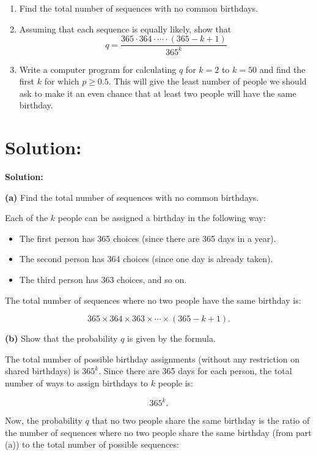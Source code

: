 \documentclass{article}
\begin{document}
\begin{enumerate}
    \item[(a)] Find the total number of sequences with no common birthdays.
    
    \item[(b)] Assuming that each sequence is equally likely, show that
    \[
    q = \frac{365 \cdot 364 \cdot \cdots \cdot (365 - k + 1)}{365^k}
    \]

    \item[(c)] Write a computer program for calculating \( q \) for \( k = 2 \) to \( k = 50 \) and find the first \( k \) for which \( p \geq 0.5 \). This will give the least number of people we should ask to make it an even chance that at least two people will have the same birthday.
\end{enumerate}

\section*{Solution:}

\textbf{Solution:}

\textbf{(a)} Find the total number of sequences with no common birthdays.

Each of the \( k \) people can be assigned a birthday in the following way:

\begin{itemize}
    \item The first person has 365 choices (since there are 365 days in a year).
    \item The second person has 364 choices (since one day is already taken).
    \item The third person has 363 choices, and so on.
\end{itemize}

The total number of sequences where no two people have the same birthday is:

\[
365 \times 364 \times 363 \times \cdots \times (365 - k + 1).
\]

\textbf{(b)} Show that the probability \( q \) is given by the formula.

The total number of possible birthday assignments (without any restriction on shared birthdays) is \( 365^k \). Since there are 365 days for each person, the total number of ways to assign birthdays to \( k \) people is:

\[
365^k.
\]

Now, the probability \( q \) that no two people share the same birthday is the ratio of the number of sequences where no two people share the same birthday (from part (a)) to the total number of possible sequences:
\end{document}
